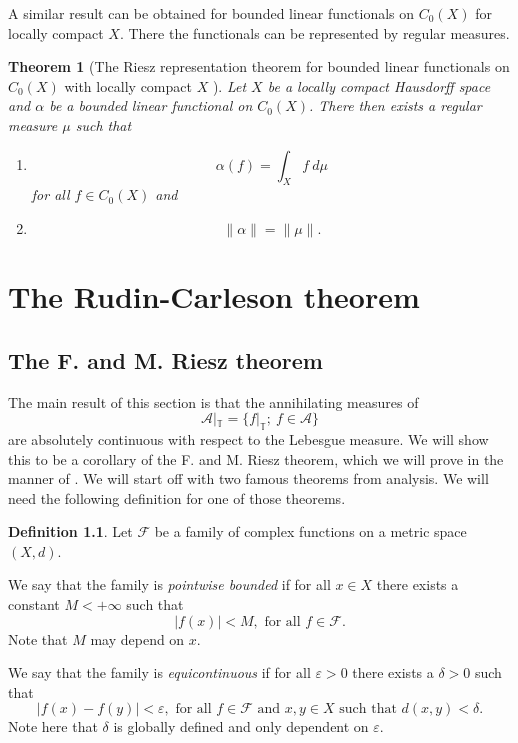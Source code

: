 \documentclass[a4paper,12pt,twoside,BCOR=10mm]{scrbook}
\newtheorem{theorem}{Theorem}[section]
\theoremstyle{definition}
\theoremstyle{definition}
\theoremstyle{definition}
\newtheorem{definition}[theorem]{Definition}
\begin{document}
A similar result can be obtained for bounded linear functionals on $C_0(X)$ for locally compact $X$.
There the functionals can be represented by regular measures.
\begin{theorem}[The Riesz representation theorem for bounded linear functionals on $C_0(X)$ with locally compact $X$ \citep{rudin2}]
\label{riesz}
Let $X$ be a locally compact Hausdorff space and $\alpha$ be a bounded linear functional on $C_0(X)$.
There then exists a regular measure $\mu$ such that
\begin{enumerate}
\item[\emph{(i)}]
\[
	\alpha(f) = \int_X f\ d\mu
\]
for all $f \in C_0(X)$ and
\item[\emph{(ii)}]
\[
	\|\alpha\| = \|\mu\|.
\]
\end{enumerate}
\end{theorem}




\chapter{The Rudin-Carleson theorem}
\section{The F. and M. Riesz theorem}
\label{section1}
The main result of this section is that the annihilating measures of 
\[
\label{index17}
	\mathcal{A}|_{\mathbb{T}} = \{f|_{\mathbb{T}};\ f \in \mathcal{A}\}
\]
are absolutely continuous with respect to the Lebesgue measure.
We will show this to be a corollary of the F. and M. Riesz theorem, which we will prove in the manner of \citep{rudin2}.
We will start off with two famous theorems from analysis. 
We will need the following definition for one of those theorems.
\begin{definition}
\label{index18}
Let $\mathcal{F}$ be a family of complex functions on a metric space $(X, d)$.

We say that the family is \emph{pointwise bounded} if for all $x \in X$ there exists a constant $M < +\infty$ such that
\[
	|f(x)| < M,\text{ for all } f \in \mathcal{F}.
\]
Note that $M$ may depend on $x$.

We say that the family is \emph{equicontinuous} if for all $\varepsilon > 0$ there exists a $\delta > 0$ such that
\[
	|f(x) - f(y)| < \varepsilon,\text{ for all } f \in \mathcal{F}\text{ and } x, y \in X\text{ such that } d(x, y) < \delta.
\]
Note here that $\delta$ is globally defined and only dependent on $\varepsilon$.
\end{definition}
\end{document}
